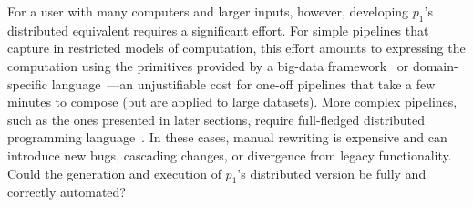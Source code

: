 \documentclass[sigplan,10pt,review,anonymous]{acmart}
\newcommand{\eg}{{\em e.g.}, }
\newcommand{\ttt}[1]{\texttt{\small #1}}
\begin{document}
For a user with many computers and larger inputs, however, developing $p_1$'s distributed equivalent requires a significant effort.
For simple pipelines that capture in restricted models of computation, this effort amounts to expressing the computation using the primitives provided by a big-data framework~\cite{mapreduce:08, ciel:11, spark:12, naiad:13} or domain-specific language~\cite{alvaro2011consistency, distal:13, meiklejohn2015lasp}---an unjustifiable cost for one-off pipelines that take a few minutes to compose (but are applied to large datasets).
More complex pipelines, such as the ones presented in later sections, require full-fledged distributed programming language~\cite{erlang:96, lopes1997d, acute:05, mace:07, cloudhaskell:11, ScalaLoci:18}. %
In these cases, manual rewriting is expensive and can introduce new bugs, cascading changes, or divergence from legacy functionality.
Could the generation and execution of $p_1$'s distributed version be fully and correctly automated?

% 
% 
% 
% 
% 
% 
% 
% 
\end{document}

